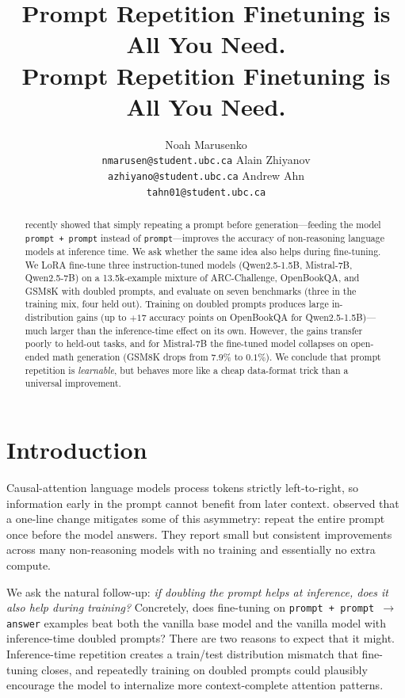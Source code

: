 \documentclass{article}
\title{Prompt Repetition Finetuning is All You Need. \\ Prompt Repetition Finetuning is All You Need. }
\author{%
  Noah Marusenko\\
  \texttt{nmarusen@student.ubc.ca}
  \And
  Alain Zhiyanov\\
  \texttt{azhiyano@student.ubc.ca}
  \And
  Andrew Ahn\\
  \texttt{tahn01@student.ubc.ca}
}
\begin{document}
\maketitle


\begin{abstract}
\citet{leviathan2025} recently showed that simply repeating a prompt
before generation---feeding the model \texttt{prompt + prompt} instead
of \texttt{prompt}---improves the accuracy of non-reasoning language
models at inference time. We ask whether the same idea also helps during
fine-tuning. We LoRA fine-tune three instruction-tuned models
(Qwen2.5-1.5B, Mistral-7B, Qwen2.5-7B) on a 13.5k-example mixture of
ARC-Challenge, OpenBookQA, and GSM8K with doubled prompts, and evaluate
on seven benchmarks (three in the training mix, four held out). Training
on doubled prompts produces large in-distribution gains (up to $+17$
accuracy points on OpenBookQA for Qwen2.5-1.5B)---much larger than the
inference-time effect on its own. However, the gains transfer poorly to
held-out tasks, and for Mistral-7B the fine-tuned model collapses on
open-ended math generation (GSM8K drops from $7.9\%$ to $0.1\%$). We
conclude that prompt repetition is \emph{learnable}, but behaves more
like a cheap data-format trick than a universal improvement.
\end{abstract}


\section{Introduction}

Causal-attention language models process tokens strictly left-to-right,
so information early in the prompt cannot benefit from later context.
\citet{leviathan2025} observed that a one-line change mitigates some of
this asymmetry: repeat the entire prompt once before the model answers.
They report small but consistent improvements across many
non-reasoning models with no training and essentially no extra compute.

We ask the natural follow-up: \emph{if doubling the prompt helps at
inference, does it also help during training?} Concretely, does
fine-tuning on \texttt{prompt + prompt $\to$ answer} examples beat
both the vanilla base model and the vanilla model with inference-time
doubled prompts? There are two reasons to expect that it might.
Inference-time repetition creates a train/test distribution mismatch
that fine-tuning closes, and repeatedly training on doubled prompts
could plausibly encourage the model to internalize more
context-complete attention patterns.
\end{document}
